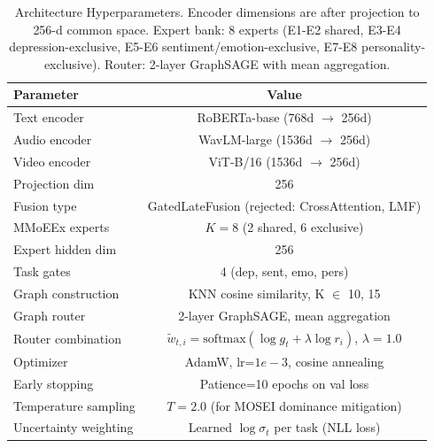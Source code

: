 \begin{table}[htbp]
\centering
\caption{Architecture Hyperparameters. Encoder dimensions are after projection to 256-d common space. Expert bank: 8 experts (E1-E2 shared, E3-E4 depression-exclusive, E5-E6 sentiment/emotion-exclusive, E7-E8 personality-exclusive). Router: 2-layer GraphSAGE with mean aggregation.}
\label{tab:hyperparameters}
\begin{tabular}{lc}
\toprule
Parameter & Value \\
\midrule
Text encoder & RoBERTa-base (768d $\to$ 256d) \\
Audio encoder & WavLM-large (1536d $\to$ 256d) \\
Video encoder & ViT-B/16 (1536d $\to$ 256d) \\
Projection dim & 256 \\
Fusion type & GatedLateFusion (rejected: CrossAttention, LMF) \\
MMoEEx experts & $K=8$ (2 shared, 6 exclusive) \\
Expert hidden dim & 256 \\
Task gates & 4 (dep, sent, emo, pers) \\
Graph construction & KNN cosine similarity, K $\in$ {10, 15} \\
Graph router & 2-layer GraphSAGE, mean aggregation \\
Router combination & $\tilde{w}_{t,i} = \text{softmax}(\log g_t + \lambda \log r_i)$, $\lambda=1.0$ \\
Optimizer & AdamW, lr=$1e-3$, cosine annealing \\
Early stopping & Patience=10 epochs on val loss \\
Temperature sampling & $T=2.0$ (for MOSEI dominance mitigation) \\
Uncertainty weighting & Learned $\log \sigma_t$ per task (NLL loss) \\
\bottomrule
\end{tabular}
\end{table}